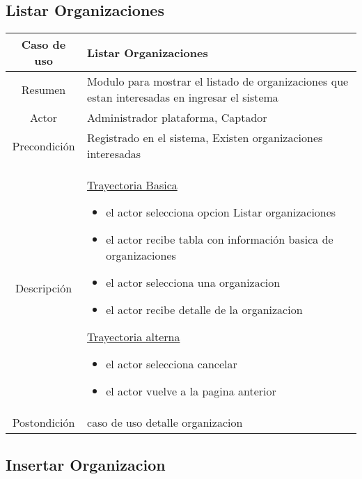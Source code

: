 \documentclass[letterpaper,openright,10pt,oneside]{report}
\begin{document}
\subsection{Listar Organizaciones}

\begin{tabular}{|c|p{110mm}|}
\hline
	Caso de uso & Listar Organizaciones\\
\hline
	Resumen & Modulo para mostrar el listado de organizaciones que estan interesadas en ingresar el sistema\\
\hline
	Actor & Administrador plataforma, Captador\\
\hline
	Precondición & Registrado en el sistema, Existen organizaciones interesadas\\
\hline
	Descripción & 
	\underline{Trayectoria Basica}
	\begin{itemize}
		\item el actor selecciona opcion Listar organizaciones
		\item el actor recibe tabla con información basica de organizaciones
		\item el actor selecciona una organizacion
		\item el actor recibe detalle de la organizacion
	\end{itemize}
	\underline{Trayectoria alterna}
	\begin{itemize}
		\item el actor selecciona cancelar
		\item el actor vuelve a la pagina anterior
	\end{itemize}\\
\hline
	Postondición & caso de uso detalle organizacion\\
\hline
\end{tabular}


\subsection{Insertar Organizacion}
\end{document}
